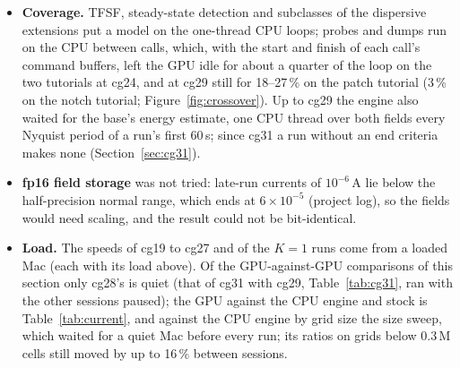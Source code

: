 \begin{itemize}
  5.1\,M cells, the GCPW line ran between patch x5 and notch x3 (Figure~\ref{fig:crossover}). The SMA launch,
  1\,829\,\MC\ at 1.07\,M cells in Table~\ref{tab:current} against 2\,747--2\,812 for the GCPW line and the patch
  antenna at 1.1--1.4\,M cells in the size sweep (another session), was not scaled. The tuner picks among four tilings
  only. Since cg31 (Section~\ref{sec:cg31}) a block takes three dispatches, the UPML and the dispersive stages take a
  z-vector or the three components of a cell at a time, Mur faces of one axis share a barrier and the tuner has seven
  tilings: the GCPW line and the SMA launch (0.871\,M cells) gained 1.09$\times$ and 1.14$\times$
  (Table~\ref{tab:cg31}). The extensions still cost, and the cost is tied to their code being compiled into the
  kernel, not to the loops over their cells; that is not explained.
\item \textbf{Coverage.} TFSF, steady-state detection and subclasses of the dispersive extensions put a model on the
  one-thread CPU loops; probes and dumps run on the CPU between calls, which, with the start and finish of each call's
  command buffers, left the GPU idle for about a quarter of the loop on the two tutorials at cg24, and at cg29 still for 18--27\,\% on the patch tutorial (3\,\% on the notch
  tutorial; Figure~\ref{fig:crossover}). Up to cg29 the engine also waited for the base's energy estimate, one CPU
  thread over both fields every Nyquist period of a run's first 60\,s; since cg31 a run without an end criteria makes
  none (Section~\ref{sec:cg31}).
\item \textbf{fp16 field storage} was not tried: late-run currents of $10^{-6}$\,A lie below the half-precision normal
  range, which ends at $6\times10^{-5}$ (project log), so the fields would need scaling, and the result could not be
  bit-identical.
\item \textbf{Load.} The speeds of cg19 to cg27 and of the $K=1$ runs come from a loaded Mac (each with its load
  above). Of the GPU-against-GPU comparisons of this section only cg28's is quiet (that of cg31 with cg29,
  Table~\ref{tab:cg31}, ran with the other sessions paused); the GPU against the CPU engine and stock is
  Table~\ref{tab:current}, and against the CPU engine by grid size the size sweep, which waited for a quiet Mac
  before every run; its ratios on grids below 0.3\,M cells still moved by up to 16\,\% between sessions.
\end{itemize}
